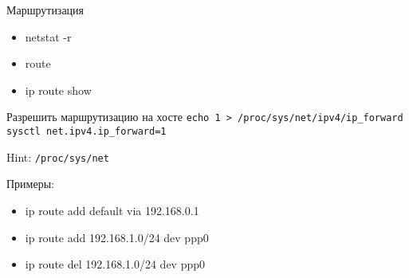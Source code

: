 \begin{frame}{Маршрутизация}
	\begin{itemize}
		\item netstat -r
		\item route
		\item ip route show
	\end{itemize}

	\begin{block}{Разрешить маршрутизацию на хосте}
		{\tt echo 1 > /proc/sys/net/ipv4/ip\_forward}\\
		{\tt sysctl net.ipv4.ip\_forward=1}
	\end{block}
	
	Hint: {\tt /proc/sys/net}

	Примеры:
	\begin{itemize}
		\item ip route add default via 192.168.0.1
		\item ip route add 192.168.1.0/24 dev ppp0
		\item ip route del 192.168.1.0/24 dev ppp0
	\end{itemize}

\end{frame}


